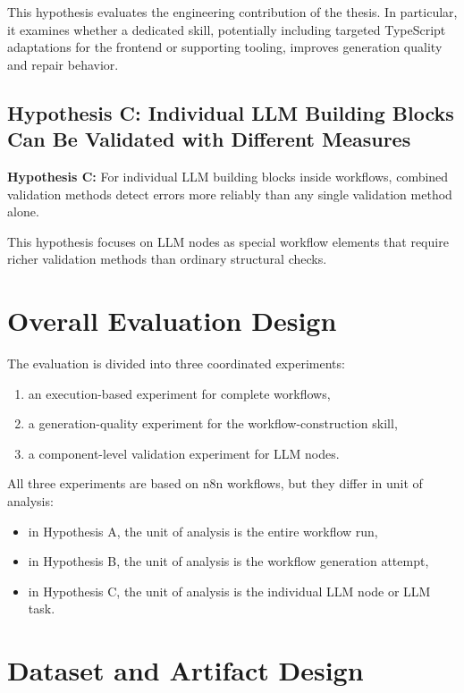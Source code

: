 \documentclass[12pt,a4paper]{article}
\begin{document}
This hypothesis evaluates the engineering contribution of the thesis. In particular, it examines whether a dedicated skill, potentially including targeted TypeScript adaptations for the frontend or supporting tooling, improves generation quality and repair behavior.

\subsection{Hypothesis C: Individual LLM Building Blocks Can Be Validated with Different Measures}

\textbf{Hypothesis C:} For individual LLM building blocks inside workflows, combined validation methods detect errors more reliably than any single validation method alone.

This hypothesis focuses on LLM nodes as special workflow elements that require richer validation methods than ordinary structural checks.

\section{Overall Evaluation Design}

The evaluation is divided into three coordinated experiments:

\begin{enumerate}
  \item an execution-based experiment for complete workflows,
  \item a generation-quality experiment for the workflow-construction skill,
  \item a component-level validation experiment for LLM nodes.
\end{enumerate}

All three experiments are based on n8n workflows, but they differ in unit of analysis:

\begin{itemize}
  \item in Hypothesis A, the unit of analysis is the entire workflow run,
  \item in Hypothesis B, the unit of analysis is the workflow generation attempt,
  \item in Hypothesis C, the unit of analysis is the individual LLM node or LLM task.
\end{itemize}

\section{Dataset and Artifact Design}
\end{document}
